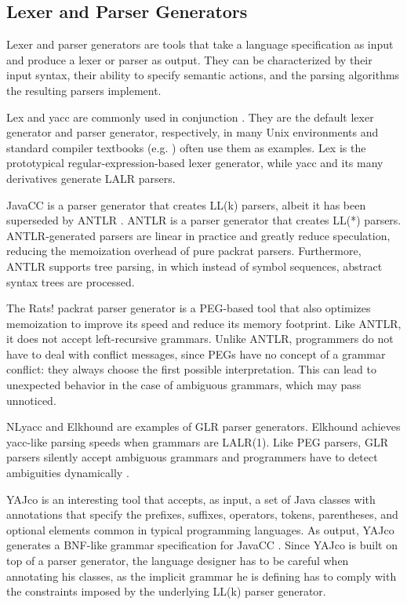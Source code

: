 \documentclass[preprint]{elsarticle}
\begin{document}
\subsection{Lexer and Parser Generators} \label{subsec:generators}

Lexer and parser generators are tools that take a language specification as input and produce a lexer or parser as output.
They can be characterized by their input syntax, their ability to specify semantic actions, and the parsing algorithms the resulting parsers implement.

Lex \cite{lex} and yacc \cite{yacc} are commonly used in conjunction \cite{Levine1992}.
They are the default lexer generator and parser generator, respectively, in many Unix environments and standard compiler textbooks (e.g. \cite{Aho2006}) often use them as examples.
Lex is the prototypical regular-expression-based lexer generator, while yacc and its many derivatives generate LALR parsers.

JavaCC \cite{McManis1996} is a parser generator that creates LL(k) parsers, albeit it has been superseded by ANTLR \cite{Parr1995}.
ANTLR is a parser generator that creates LL(*) parsers.
ANTLR-generated parsers are linear in practice and greatly reduce speculation, reducing the memoization overhead of pure packrat parsers.
Furthermore, ANTLR supports tree parsing, in which instead of symbol sequences, abstract syntax trees are processed.

The Rats! \cite{Grimm2006} packrat parser generator is a PEG-based tool that also optimizes memoization to improve its speed and reduce its memory footprint.
Like ANTLR, it does not accept left-recursive grammars.
Unlike ANTLR, programmers do not have to deal with conflict messages, since PEGs have no concept of a grammar conflict: they always choose the first possible interpretation.
This can lead to unexpected behavior in the case of ambiguous grammars, which may pass unnoticed.

NLyacc \cite{Ishii1994} and Elkhound \cite{McPeak2004} are examples of GLR parser generators. Elkhound achieves yacc-like parsing speeds when grammars are LALR(1).
Like PEG parsers, GLR parsers silently accept ambiguous grammars and programmers have to detect ambiguities dynamically \cite{Parr2011}.

YAJco \cite{Poruban2009} is an interesting tool that accepts, as input, a set of Java classes with annotations that specify the prefixes, suffixes, operators, tokens, parentheses, and optional elements common in typical programming languages.
As output, YAJco generates a BNF-like grammar specification for JavaCC \cite{McManis1996}.
Since YAJco is built on top of a parser generator, the language designer has to be careful when annotating his classes, as the implicit grammar he is defining has to comply with the constraints imposed by the underlying LL(k) parser generator.
\end{document}
